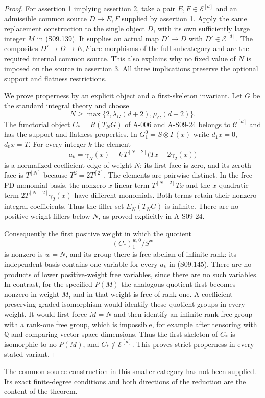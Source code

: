 \begin{proof}
For assertion 1 implying assertion 2, take a pair
$E,F\in\mathcal E^{[d]}$ and an admissible common
source $D\to E,F$ supplied by assertion 1.
Apply the same replacement construction to the
single object $D$, with its own sufficiently large
integer $M$ in (S09.139).  It supplies an actual
map $D'\to D$ with $D'\in\mathcal E^{[d]}$.
The composites $D'\to D\to E,F$ are morphisms
of the full subcategory and are the required
internal common source.  This also explains why
no fixed value of $N$ is imposed on the source in
assertion 3.  All three implications preserve the
optional support and flatness restrictions.

We prove properness by an explicit object and a
first-skeleton invariant.  Let $G$ be the standard
integral theory and choose
\[
 N\geq\max\{2,\lambda_G(d+2),\mu_G(d+2)\}.
 \tag{S09.144}
\]
The functorial object $C_*=R(T_NG)$ of A-006 and
A-S09-24 belongs to $\mathcal C^{[d]}$ and has
the support and flatness properties.
In $G_1^0=S\otimes\Gamma(x)$ write $d_1x=0$,
$d_0x=T$.  For every integer $k$ the element
\[
 a_k=\gamma_N(x)+k\,T^{[N-2]}
                              \bigl(Tx-2\gamma_2(x)\bigr)
 \tag{S09.145}
\]
is a normalized coefficient edge of weight $N$:
its first face is zero, and its zeroth face is
$T^{[N]}$ because $T^2=2T^{[2]}$.
The elements are pairwise distinct.  In the free
PD monomial basis, the nonzero $x$-linear term
$T^{[N-2]}Tx$ and the $x$-quadratic term
$2T^{[N-2]}\gamma_2(x)$ have different monomials.
Both terms retain their nonzero integral coefficients.
Thus the filler set $E_N(T_NG)$ is infinite.
There are no positive-weight fillers below $N$,
as proved explicitly in A-S09-24.

Consequently the first positive weight in which
the quotient
\[
             (C_*)_1^{w,0}/S^w
 \tag{S09.146}
\]
is nonzero is $w=N$, and its group there is free
abelian of infinite rank: its independent basis
contains one variable for every $a_k$ in (S09.145).
There are no products of lower positive-weight
free variables, since there are no such variables.
In contrast, for the specified $P(M)$ the analogous
quotient first becomes nonzero in weight $M$, and
in that weight is free of rank one.
A coefficient-preserving graded isomorphism would
identify these quotient groups in every weight.
It would first force $M=N$ and then identify an
infinite-rank free group with a rank-one free group,
which is impossible, for example after tensoring
with $\mathbb Q$ and comparing vector-space dimensions.
Thus the first skeleton of $C_*$ is isomorphic to
no $P(M)$, and $C_*\notin\mathcal E^{[d]}$.
This proves strict properness in every stated variant.
\end{proof}

The common-source construction in this smaller category
has not been supplied.  Its exact finite-degree conditions
and both directions of the reduction are the content of
the theorem.
